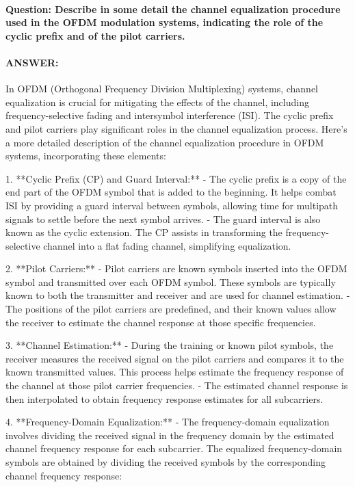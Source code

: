\documentclass[colorlinks,11pt,a4paper,normalphoto,withhyper,ragged2e]{altareport}
\begin{document}
				
				
				
				
				\paragraph{Question: Describe in some detail the channel equalization procedure used in the OFDM modulation systems, indicating the role of the cyclic prefix and of the pilot carriers.}
				\paragraph{ANSWER:}
				
				In OFDM (Orthogonal Frequency Division Multiplexing) systems, channel equalization is crucial for mitigating the effects of the channel, including frequency-selective fading and intersymbol interference (ISI). The cyclic prefix and pilot carriers play significant roles in the channel equalization process. Here's a more detailed description of the channel equalization procedure in OFDM systems, incorporating these elements:
				
				1. **Cyclic Prefix (CP) and Guard Interval:**
				- The cyclic prefix is a copy of the end part of the OFDM symbol that is added to the beginning. It helps combat ISI by providing a guard interval between symbols, allowing time for multipath signals to settle before the next symbol arrives.
				- The guard interval is also known as the cyclic extension. The CP assists in transforming the frequency-selective channel into a flat fading channel, simplifying equalization.
				
				2. **Pilot Carriers:**
				- Pilot carriers are known symbols inserted into the OFDM symbol and transmitted over each OFDM symbol. These symbols are typically known to both the transmitter and receiver and are used for channel estimation.
				- The positions of the pilot carriers are predefined, and their known values allow the receiver to estimate the channel response at those specific frequencies.
				
				3. **Channel Estimation:**
				- During the training or known pilot symbols, the receiver measures the received signal on the pilot carriers and compares it to the known transmitted values. This process helps estimate the frequency response of the channel at those pilot carrier frequencies.
				- The estimated channel response is then interpolated to obtain frequency response estimates for all subcarriers.
				
				4. **Frequency-Domain Equalization:**
				- The frequency-domain equalization involves dividing the received signal in the frequency domain by the estimated channel frequency response for each subcarrier. The equalized frequency-domain symbols are obtained by dividing the received symbols by the corresponding channel frequency response:
				
\end{document}
